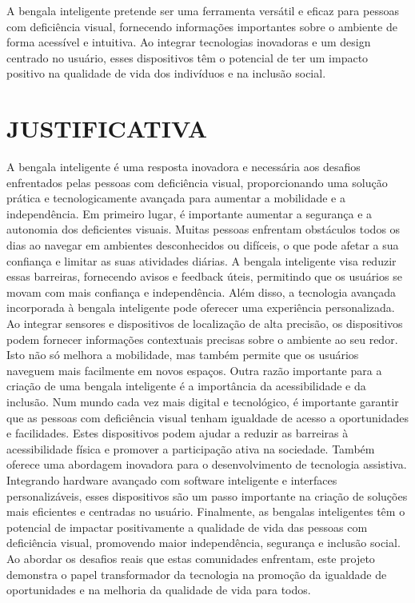 A bengala inteligente pretende ser uma ferramenta versátil e eficaz para pessoas com deficiência visual, fornecendo informações importantes sobre o ambiente de forma acessível e intuitiva. Ao integrar tecnologias inovadoras e um design centrado no usuário, esses dispositivos têm o potencial de ter um impacto positivo na qualidade de vida dos indivíduos e na inclusão social.


\section{JUSTIFICATIVA}
A bengala inteligente é uma resposta inovadora e necessária aos desafios enfrentados pelas pessoas com deficiência visual, proporcionando uma solução prática e tecnologicamente avançada para aumentar a mobilidade e a independência.
Em primeiro lugar, é importante aumentar a segurança e a autonomia dos deficientes visuais. Muitas pessoas enfrentam obstáculos todos os dias ao navegar em ambientes desconhecidos ou difíceis, o que pode afetar a sua confiança e limitar as suas atividades diárias. A bengala inteligente visa reduzir essas barreiras, fornecendo avisos e feedback úteis, permitindo que os usuários se movam com mais confiança e independência.
Além disso, a tecnologia avançada incorporada à bengala inteligente pode oferecer uma experiência personalizada. Ao integrar sensores e dispositivos de localização de alta precisão, os dispositivos podem fornecer informações contextuais precisas sobre o ambiente ao seu redor. Isto não só melhora a mobilidade, mas também permite que os usuários naveguem mais facilmente em novos espaços.
Outra razão importante para a criação de uma bengala inteligente é a importância da acessibilidade e da inclusão. Num mundo cada vez mais digital e tecnológico, é importante garantir que as pessoas com deficiência visual tenham igualdade de acesso a oportunidades e facilidades. Estes dispositivos podem ajudar a reduzir as barreiras à acessibilidade física e promover a participação ativa na sociedade. Também oferece uma abordagem inovadora para o desenvolvimento de tecnologia assistiva. Integrando hardware avançado com software inteligente e interfaces personalizáveis, esses dispositivos são um passo importante na criação de soluções mais eficientes e centradas no usuário.
Finalmente, as bengalas inteligentes têm o potencial de impactar positivamente a qualidade de vida das pessoas com deficiência visual, promovendo maior independência, segurança e inclusão social. Ao abordar os desafios reais que estas comunidades enfrentam, este projeto demonstra o papel transformador da tecnologia na promoção da igualdade de oportunidades e na melhoria da qualidade de vida para todos.

